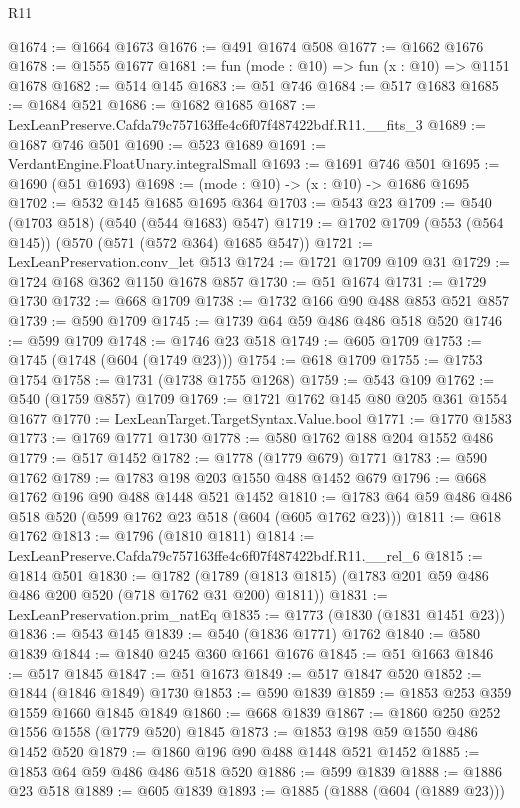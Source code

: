 \begin{lexlean}{R11}
\begin{coremodule}
@1674 := @1664 @1673
@1676 := @491 @1674 @508
@1677 := @1662 @1676
@1678 := @1555 @1677
@1681 := fun (mode : @10) => fun (x : @10) => @1151 @1678
@1682 := @514 @145
@1683 := @51 @746
@1684 := @517 @1683
@1685 := @1684 @521
@1686 := @1682 @1685
@1687 := LexLeanPreserve.Cafda79c757163ffe4c6f07f487422bdf.R11.__fits_3
@1689 := @1687 @746 @501
@1690 := @523 @1689
@1691 := VerdantEngine.FloatUnary.integralSmall
@1693 := @1691 @746 @501
@1695 := @1690 (@51 @1693)
@1698 := (mode : @10) -> (x : @10) -> @1686 @1695
@1702 := @532 @145 @1685 @1695 @364
@1703 := @543 @23
@1709 := @540 (@1703 @518) (@540 (@544 @1683) @547)
@1719 := @1702 @1709 (@553 (@564 @145)) (@570 (@571 (@572 @364) @1685 @547))
@1721 := LexLeanPreservation.conv_let @513
@1724 := @1721 @1709 @109 @31
@1729 := @1724 @168 @362 @1150 @1678 @857
@1730 := @51 @1674
@1731 := @1729 @1730
@1732 := @668 @1709
@1738 := @1732 @166 @90 @488 @853 @521 @857
@1739 := @590 @1709
@1745 := @1739 @64 @59 @486 @486 @518 @520
@1746 := @599 @1709
@1748 := @1746 @23 @518
@1749 := @605 @1709
@1753 := @1745 (@1748 (@604 (@1749 @23)))
@1754 := @618 @1709
@1755 := @1753 @1754
@1758 := @1731 (@1738 @1755 @1268)
@1759 := @543 @109
@1762 := @540 (@1759 @857) @1709
@1769 := @1721 @1762 @145 @80 @205 @361 @1554 @1677
@1770 := LexLeanTarget.TargetSyntax.Value.bool
@1771 := @1770 @1583
@1773 := @1769 @1771 @1730
@1778 := @580 @1762 @188 @204 @1552 @486
@1779 := @517 @1452
@1782 := @1778 (@1779 @679) @1771
@1783 := @590 @1762
@1789 := @1783 @198 @203 @1550 @488 @1452 @679
@1796 := @668 @1762 @196 @90 @488 @1448 @521 @1452
@1810 := @1783 @64 @59 @486 @486 @518 @520 (@599 @1762 @23 @518 (@604 (@605 @1762 @23)))
@1811 := @618 @1762
@1813 := @1796 (@1810 @1811)
@1814 := LexLeanPreserve.Cafda79c757163ffe4c6f07f487422bdf.R11.__rel_6
@1815 := @1814 @501
@1830 := @1782
    (@1789 (@1813 @1815) (@1783 @201 @59 @486 @486 @200 @520 (@718 @1762 @31 @200) @1811))
@1831 := LexLeanPreservation.prim_natEq
@1835 := @1773 (@1830 (@1831 @1451 @23))
@1836 := @543 @145
@1839 := @540 (@1836 @1771) @1762
@1840 := @580 @1839
@1844 := @1840 @245 @360 @1661 @1676
@1845 := @51 @1663
@1846 := @517 @1845
@1847 := @51 @1673
@1849 := @517 @1847 @520
@1852 := @1844 (@1846 @1849) @1730
@1853 := @590 @1839
@1859 := @1853 @253 @359 @1559 @1660 @1845 @1849
@1860 := @668 @1839
@1867 := @1860 @250 @252 @1556 @1558 (@1779 @520) @1845
@1873 := @1853 @198 @59 @1550 @486 @1452 @520
@1879 := @1860 @196 @90 @488 @1448 @521 @1452
@1885 := @1853 @64 @59 @486 @486 @518 @520
@1886 := @599 @1839
@1888 := @1886 @23 @518
@1889 := @605 @1839
@1893 := @1885 (@1888 (@604 (@1889 @23)))

\end{coremodule}
\end{lexlean}
